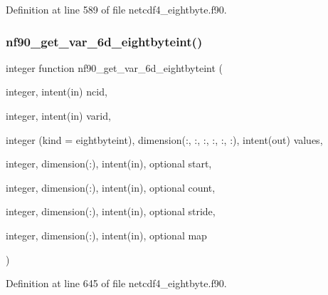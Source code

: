 Definition at line 589 of file netcdf4\+\_\+eightbyte.\+f90.

\mbox{\label{netcdf4__eightbyte_8f90_a98c01b59edd61dfa5608ab76dbac07ef}} 
\subsubsection{\texorpdfstring{nf90\+\_\+get\+\_\+var\+\_\+6d\+\_\+eightbyteint()}{nf90\_get\_var\_6d\_eightbyteint()}}
{\footnotesize\ttfamily integer function nf90\+\_\+get\+\_\+var\+\_\+6d\+\_\+eightbyteint (\begin{DoxyParamCaption}\item[{integer, intent(in)}]{ncid,  }\item[{integer, intent(in)}]{varid,  }\item[{integer (kind = eightbyteint), dimension(\+:, \+:, \+:, \+:, \+:, \+:), intent(out)}]{values,  }\item[{integer, dimension(\+:), intent(in), optional}]{start,  }\item[{integer, dimension(\+:), intent(in), optional}]{count,  }\item[{integer, dimension(\+:), intent(in), optional}]{stride,  }\item[{integer, dimension(\+:), intent(in), optional}]{map }\end{DoxyParamCaption})}



Definition at line 645 of file netcdf4\+\_\+eightbyte.\+f90.

\mbox{\label{netcdf4__eightbyte_8f90_aa72f717e4c1e4bba1378e0c40c310ce3}} 
